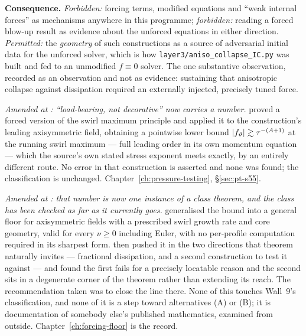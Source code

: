 \textbf{Consequence.} \emph{Forbidden:} forcing terms, modified equations and
``weak internal forces'' as mechanisms anywhere in this programme;
\emph{forbidden:} reading a forced blow-up result as evidence about the
unforced equations in either direction. \emph{Permitted:} the \emph{geometry}
of such constructions as a source of adversarial initial data for the unforced
solver, which is how \texttt{layer3/aniso\_collapse\_IC.py} was built and fed
to an unmodified \(f\equiv0\) solver. The one substantive observation, recorded
as an observation and not as evidence: sustaining that anisotropic collapse
against dissipation required an externally injected, precisely tuned force.

\emph{Amended at : ``load-bearing, not decorative'' now carries a
number.}  proved a forced version of the swirl maximum principle and
applied it to the construction's leading axisymmetric field, obtaining a
pointwise lower bound \(\left|f_\vartheta\right|\gtrsim\tau^{-(A+1)}\) at the running
swirl maximum --- full leading order in its own momentum equation --- which the
source's own stated stress exponent meets exactly, by an entirely different
route. No error in that construction is asserted and none was found; the
classification is unchanged. Chapter~\ref{ch:pressure-testing},
\S\ref{sec:pt-s55}.

\emph{Amended at : that number is now one instance of a class theorem,
and the class has been checked as far as it currently goes.} 
generalised the  bound into a general floor for axisymmetric fields
with a prescribed swirl growth rate and core geometry, valid for every
\(\nu\ge0\) including Euler, with no per-profile computation required in its
sharpest form.  then pushed it in the two directions that theorem
naturally invites --- fractional dissipation, and a second construction to
test it against --- and found the first fails for a precisely locatable
reason and the second sits in a degenerate corner of the theorem rather than
extending its reach. The recommendation taken was to close the line there.
None of this touches Wall~9's classification, and none of it is a step
toward alternatives (A) or (B); it is documentation of somebody else's
published mathematics, examined from outside. Chapter~\ref{ch:forcing-floor}
is the record.

